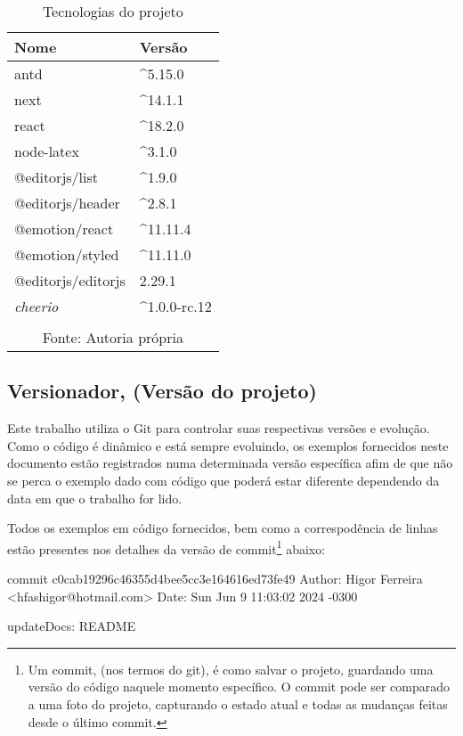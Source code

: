 \begin{table}[H]
    \centering
    \caption{Tecnologias do projeto}
    \label{tbl:tecnologias-projeto}
    \renewcommand{\arraystretch}{1.5}
    \begin{tabular}{p{3.2000cm} p{4.8000cm}}
        \hline
        \textbf{Nome} & \textbf{Versão} \\
        \hline
        antd & \textasciicircum 5.15.0 \\
		next & \textasciicircum 14.1.1 \\
		react & \textasciicircum 18.2.0 \\
		node-latex & \textasciicircum 3.1.0 \\
		@editorjs/list & \textasciicircum 1.9.0 \\
		@editorjs/header & \textasciicircum 2.8.1 \\
		@emotion/react & \textasciicircum 11.11.4 \\
		@emotion/styled & \textasciicircum 11.11.0 \\
		@editorjs/editorjs & 2.29.1 \\
		\textit{cheerio} & \textasciicircum 1.0.0-rc.12 \\
        \hline
        \\\multicolumn{2}{c}{\fontsize{10pt}{12pt}Fonte: Autoria própria}
    \end{tabular}
\end{table}

\subsection{Versionador, (Versão do projeto)}

Este trabalho utiliza o Git para controlar suas respectivas versões e
evolução. Como o código é dinâmico e está sempre evoluindo,
os exemplos fornecidos neste documento estão registrados numa determinada
versão específica afim de que não se perca o exemplo dado com código que
poderá estar diferente dependendo da data em que o trabalho for lido.

Todos os exemplos em código fornecidos, bem como a correspodência de linhas
estão presentes nos detalhes da versão de
commit\footnote{Um commit, (nos termos do git), é como salvar o projeto, guardando uma versão do código naquele momento específico.
    O commit pode ser comparado a uma foto do projeto, capturando o estado atual e todas as mudanças feitas desde o último commit.
}
abaixo:

\begin{GitVersionCode}
commit c0cab19296c46355d4bee5cc3e164616ed73fe49
Author: Higor Ferreira <hfashigor@hotmail.com>
Date:   Sun Jun 9 11:03:02 2024 -0300

    updateDocs: README
\end{GitVersionCode}

